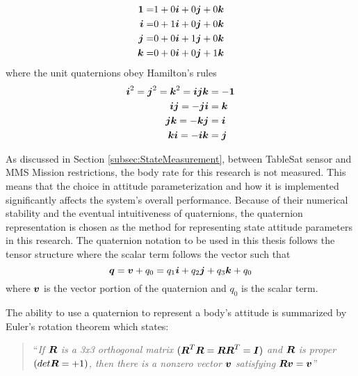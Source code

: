 \begin{subequations}
  \begin{align}
    \boldsymbol{1} = & 1 + 0\boldsymbol{i} + 0\boldsymbol{j} + 0\boldsymbol{k} \\
    \boldsymbol{i} = & 0 + 1\boldsymbol{i} + 0\boldsymbol{j} + 0\boldsymbol{k} \\
    \boldsymbol{j} = & 0 + 0\boldsymbol{i} + 1\boldsymbol{j} + 0\boldsymbol{k} \\
    \boldsymbol{k} = & 0 + 0\boldsymbol{i} + 0\boldsymbol{j} + 1\boldsymbol{k}
  \end{align}
  \label{eqn:UnitQuaternions}
\end{subequations}
where the unit quaternions obey Hamilton's rules \cite{wolfram_quaternion}
\begin{subequations}
  \begin{align}
    \boldsymbol{i}^2 = \boldsymbol{j}^2 = \boldsymbol{k}^2 = \boldsymbol{ijk} & = - \boldsymbol{1} \\
    \boldsymbol{i}\boldsymbol{j} = -\boldsymbol{j}\boldsymbol{i} &= \boldsymbol{k} \\
    \boldsymbol{j}\boldsymbol{k} = -\boldsymbol{k}\boldsymbol{j} &= \boldsymbol{i} \\
    \boldsymbol{k}\boldsymbol{i} = -\boldsymbol{i}\boldsymbol{k} &= \boldsymbol{j}
  \end{align}
  \label{eqn:HamiltonRules}
\end{subequations}

As discussed in Section \ref{subsec:StateMeasurement}, between TableSat sensor and MMS Mission restrictions, the body rate for this research is not measured.  This means that the choice in attitude parameterization and how it is implemented significantly affects the system's overall performance.  Because of their numerical stability and the eventual intuitiveness of quaternions, the quaternion representation is chosen as the method for representing state attitude parameters in this research.  The quaternion notation to be used in this thesis follows the tensor structure where the scalar term follows the vector such that
\begin{equation}
  \boldsymbol{q} = \boldsymbol{v} + q_0 = q_1 \boldsymbol{i} + q_2 \boldsymbol{j} + q_3 \boldsymbol{k} + q_0
\end{equation}
where $\boldsymbol{v}$ is the vector portion of the quaternion and $q_0$ is the scalar term.

The ability to use a quaternion to represent a body's attitude is summarized by Euler's rotation theorem which states:

\begin{quote}{``\textsl{If $\boldsymbol{R}$ is a 3x3 orthogonal matrix $( \boldsymbol{R}^T \boldsymbol{R} = \boldsymbol{R}\boldsymbol{R}^T = \boldsymbol{I} )$ and $\boldsymbol{R}$ is proper $( det \boldsymbol{R} = +1 )$, then there is a nonzero vector $\boldsymbol{v}$ satisfying $\boldsymbol{Rv} = \boldsymbol{v}$}''~\cite{euler_theorem}}\end{quote}

